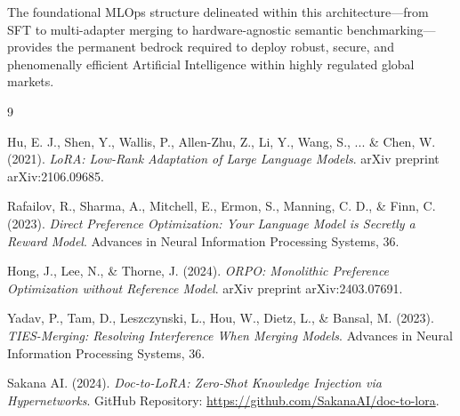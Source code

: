 \documentclass[12pt,a4paper]{report}
\begin{document}
The foundational MLOps structure delineated within this architecture---from SFT to multi-adapter merging to hardware-agnostic semantic benchmarking---provides the permanent bedrock required to deploy robust, secure, and phenomenally efficient Artificial Intelligence within highly regulated global markets.

\begin{thebibliography}{9}

Hu, E. J., Shen, Y., Wallis, P., Allen-Zhu, Z., Li, Y., Wang, S., ... \& Chen, W. (2021).
\textit{LoRA: Low-Rank Adaptation of Large Language Models}. 
arXiv preprint arXiv:2106.09685.

Rafailov, R., Sharma, A., Mitchell, E., Ermon, S., Manning, C. D., \& Finn, C. (2023).
\textit{Direct Preference Optimization: Your Language Model is Secretly a Reward Model}.
Advances in Neural Information Processing Systems, 36.

Hong, J., Lee, N., \& Thorne, J. (2024).
\textit{ORPO: Monolithic Preference Optimization without Reference Model}.
arXiv preprint arXiv:2403.07691.

Yadav, P., Tam, D., Leszczynski, L., Hou, W., Dietz, L., \& Bansal, M. (2023).
\textit{TIES-Merging: Resolving Interference When Merging Models}.
Advances in Neural Information Processing Systems, 36.

Sakana AI. (2024).
\textit{Doc-to-LoRA: Zero-Shot Knowledge Injection via Hypernetworks}.
GitHub Repository: \url{https://github.com/SakanaAI/doc-to-lora}.

\end{thebibliography}
\end{document}
